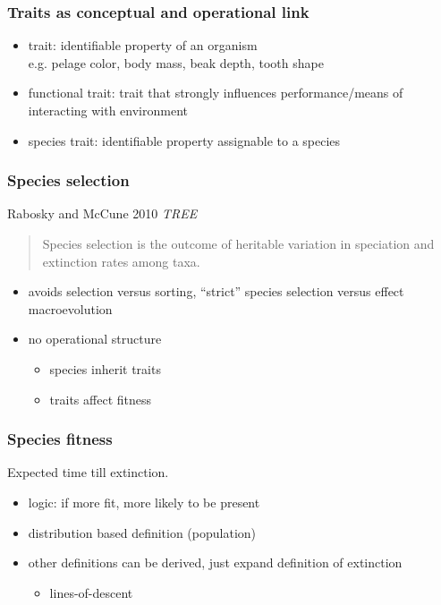 \documentclass{beamer}
\begin{document}
\begin{frame}
  \frametitle{Traits as conceptual and operational link}

  \begin{definition}
    \begin{itemize}
      \item \alert{trait}: identifiable property of an organism \\e.g. pelage color, body mass, beak depth, tooth shape
      \item \alert{functional trait}: trait that strongly influences performance/means of interacting with environment
      \item \alert{species trait}: identifiable property assignable to a species
    \end{itemize}
  \end{definition}
\end{frame}

\begin{frame}
  \frametitle{Species selection}

  \begin{block}{Rabosky and McCune 2010 \em{TREE}}
    \begin{quote}
      Species selection is the outcome of heritable variation in speciation and extinction rates among taxa.
    \end{quote}
  \end{block}

  \begin{itemize}
    \item avoids selection versus sorting, ``strict'' species selection versus effect macroevolution
    \item no operational structure
      \begin{itemize}
        \item species inherit traits
        \item traits affect fitness
      \end{itemize}
  \end{itemize}
\end{frame}

\begin{frame}
  \frametitle{Species fitness}

  \begin{definition}
    Expected time till extinction.
  \end{definition}

  \footnotesize{} 

  \begin{itemize}
    \item \alert{logic:} if more fit, more likely to be present
    \item distribution based definition (population)
    \item other definitions can be derived, just expand definition of extinction
      \begin{itemize}
        \item lines-of-descent 
      \end{itemize}
  \end{itemize}

\end{frame}
\end{document}
